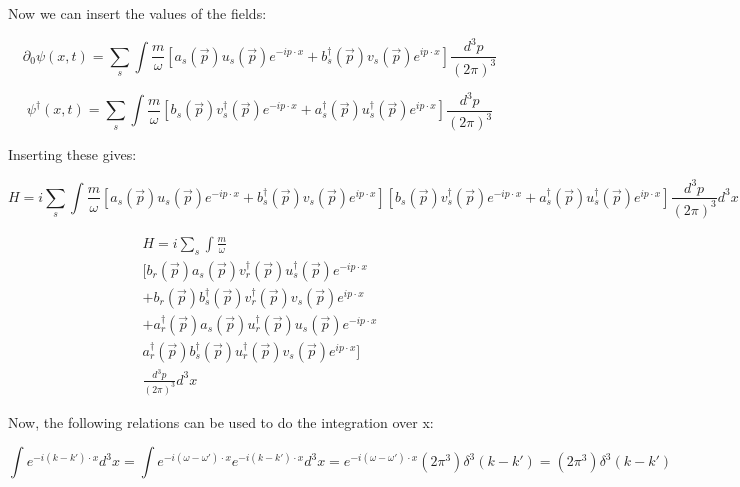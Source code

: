 \documentclass[a4]{article}
\begin{document}
    Now we can insert the values of the fields:

    \begin{equation}
        \partial_{0} \psi (x, t) = \sum_{s} \int \frac{m}{\omega} [a_s (\vec{p}) u_s (\vec{p}) e^{- i p \cdot x} + b_s^{\dagger} (\vec{p}) v_s (\vec{p}) e^{i p \cdot x}] \frac{d^{3} p}{(2 \pi)^3}
    \end{equation}

    \begin{equation}
        \psi^{\dagger} (x, t) = \sum_{s} \int \frac{m}{\omega} [b_s (\vec{p}) v_s^{\dagger} (\vec{p}) e^{- i p \cdot x} + a_s^{\dagger} (\vec{p}) u_s^{\dagger} (\vec{p}) e^{i p \cdot x}] \frac{d^{3} p}{(2 \pi)^3}
    \end{equation}

    Inserting these gives:

    \begin{equation}
        H = i \sum_{s} \int \frac{m}{\omega} [a_s (\vec{p}) u_s (\vec{p}) e^{- i p \cdot x} + b_s^{\dagger} (\vec{p}) v_s (\vec{p}) e^{i p \cdot x}] [b_s (\vec{p}) v_s^{\dagger} (\vec{p}) e^{- i p \cdot x} + a_s^{\dagger} (\vec{p}) u_s^{\dagger} (\vec{p}) e^{i p \cdot x}] \frac{d^{3} p}{(2 \pi)^3} d^3 x
    \end{equation}


    \begin{equation}
        \begin{aligned}
            H = i \sum_{s} \int \frac{m}{\omega} \\
        [b_r (\vec{p}) a_s (\vec{p}) v_r^{\dagger} (\vec{p}) u_s^{\dagger} (\vec{p}) e^{- i p \cdot x} \\
        + b_r (\vec{p}) b_s^{\dagger} (\vec{p}) v_r^{\dagger} (\vec{p}) v_s (\vec{p}) e^{i p \cdot x} \\
        + a_r^{\dagger} (\vec{p}) a_s (\vec{p}) u_r^{\dagger} (\vec{p}) u_s (\vec{p}) e^{- i p \cdot x} \\
        a_r^{\dagger} (\vec{p}) b_s^{\dagger} (\vec{p}) u_r^{\dagger} (\vec{p}) v_s (\vec{p}) e^{i p \cdot x}] \\
        \frac{d^{3} p}{(2 \pi)^3} d^3 x
        \end{aligned}
    \end{equation}

    Now, the following relations can be used to do the integration over x:

    \begin{equation}
        \int e^{-i (k-k') \cdot x} d^3 x = \int e^{-i (\omega-\omega') \cdot x} e^{-i (k-k') \cdot x} d^3 x = e^{-i (\omega-\omega') \cdot x} (2 \pi^3) \delta^3 (k - k') = (2 \pi^3) \delta^3 (k - k')
    \end{equation}
\end{document}
